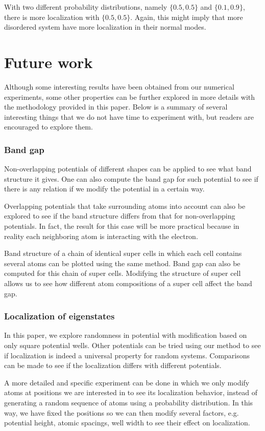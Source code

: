 With two different probability distributions, namely $\{0.5,0.5\}$ and $\{0.1,0.9\}$, there is more localization with  $\{0.5,0.5\}$. Again, this might imply that more disordered system have more localization in their normal modes. 


\section{Future work}

Although some interesting results have been obtained from our numerical experiments, some other properties can be further explored in more details with the methodology provided in this paper. Below is a summary of several interesting things that we do not have time to experiment with, but readers are encouraged to explore them.
\subsubsection{Band gap}
Non-overlapping potentials of different shapes can be applied to see what band structure it gives. One can also compute the band gap for such potential to see if there is any relation if we modify the potential in a certain way.

Overlapping potentials that take surrounding atoms into account can also be explored to see if the band structure differs from that for non-overlapping potentials. In fact, the result for this case will be more practical because in reality each neighboring atom is interacting with the electron. 

Band structure of a chain of identical super cells in which each cell contains several atoms can be plotted using the same method. Band gap can also be computed for this chain of super cells. Modifying the structure of super cell allows us to see how different atom compositions of a super cell affect the band gap. 

\subsubsection{Localization of eigenstates}
In this paper, we explore randomness in potential with modification based on only square potential wells. Other potentials can be tried using our method to see if localization is indeed a universal property for random systems. Comparisons can be made to see if the localization differs with different potentials. 

A more detailed and specific experiment can be done in which we only modify atoms at positions we are interested in to see its localization behavior, instead of generating a random sequence of atoms using a probability distribution. In this way, we have fixed the positions so we can then modify several factors, e.g. potential height, atomic spacings, well width to see their effect on localization. 


